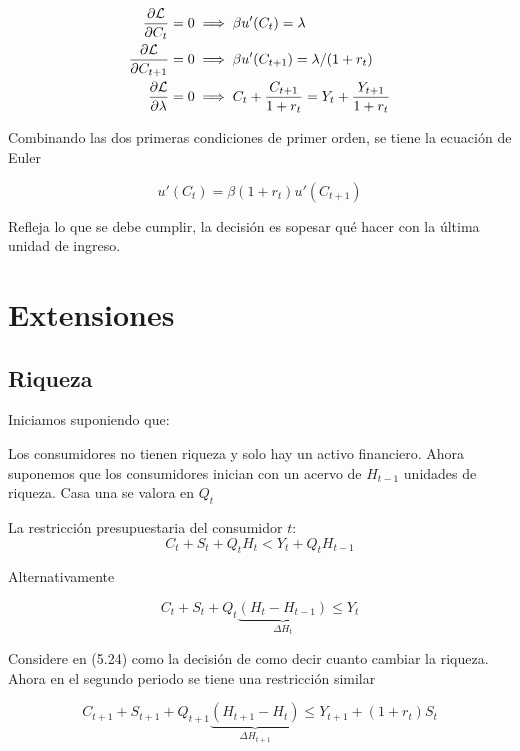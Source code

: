 \begin{align}
    \frac{\partial {\cal L}}{\partial C_{t}}  = 0 & \implies \beta u'(C_{t}) =\lambda\\
    \frac{\partial {\cal L}}{\partial C_{t+1}}  = 0 & \implies \beta u'(C_{t+1}) =\lambda/(1+r_{t}) \\
    \frac{\partial {\cal L}}{\partial \lambda}  = 0 & \implies  C_{t}+\frac{C_{t+1}}{1+r_{t}} = Y_{t}+\frac{Y_{t+1}}{1+r_{t}}
\end{align}

Combinando las dos primeras condiciones de primer orden, se tiene la ecuación de Euler

\begin{equation}
    u'(C_{t})=\beta(1+r_{t})u'(C_{t+1})
\end{equation}

Refleja lo que se debe cumplir, la decisión es sopesar qué hacer con la última unidad de ingreso. 

\section{Extensiones}

\subsection{Riqueza}

Iniciamos suponiendo que:

Los consumidores no tienen riqueza y solo hay un activo financiero. Ahora suponemos que los consumidores inician con un acervo de $H_{t-1}$ unidades de riqueza. Casa una se valora en $Q_{t}$

La restricción presupuestaria del consumidor $t$:
\begin{equation}
    C_{t}+S_{t}+Q_{t}H_{t}< Y_{t}+ Q_{t}H_{t-1}
\end{equation}

Alternativamente

\begin{equation}
    C_{t}+S_{t}+Q_{t}\underbrace{(H_{t}-H_{t-1})}_{\Delta H_{t}} \leq Y_{t}
\end{equation}

Considere en (5.24) como la decisión de como decir cuanto cambiar la riqueza. Ahora en el segundo periodo se tiene una restricción similar

\begin{equation}
    C_{t+1}+S_{t+1}+Q_{t+1}\underbrace{(H_{t+1}-H_{t})}_{\Delta H_{t+1}} \leq Y_{t+1}+ (1+r_{t})S_{t}
\end{equation}

